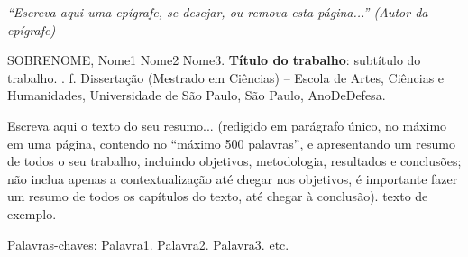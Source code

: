\documentclass[
	12pt,				%
	oneside,			%
	a4paper,			%
	english,			%
	brazil				%
	]{abntex2ppgsi}
\let\\\space
\begin{document}
%
% 
\begin{epigrafe}
    \vspace*{\fill}
	\begin{flushright}
		\textit{``Escreva aqui uma epígrafe, se desejar, ou remova esta página...''\\
		(Autor da epígrafe)}
	\end{flushright}
\end{epigrafe}


\setlength{\absparsep}{18pt} %
\begin{resumo}

% 
%
% 
%
\begin{flushleft}
SOBRENOME, Nome1 Nome2 Nome3. \textbf{Título do trabalho}: subtítulo do trabalho. \imprimirdata. \pageref{LastPage} f. Dissertação (Mestrado em Ciências) – Escola de Artes, Ciências e Humanidades, Universidade de São Paulo, São Paulo, AnoDeDefesa.
\end{flushleft}

Escreva aqui o texto do seu resumo... (redigido em parágrafo único, no máximo em uma página, contendo no ``máximo 500 palavras'', e apresentando um resumo de todos o seu trabalho, incluindo objetivos, metodologia, resultados e conclusões; não inclua apenas a contextualização até chegar nos objetivos, é importante fazer um resumo de todos os capítulos do texto, até chegar à conclusão).  texto de exemplo.

Palavras-chaves: Palavra1. Palavra2. Palavra3. etc.
\end{resumo}
\end{document}
